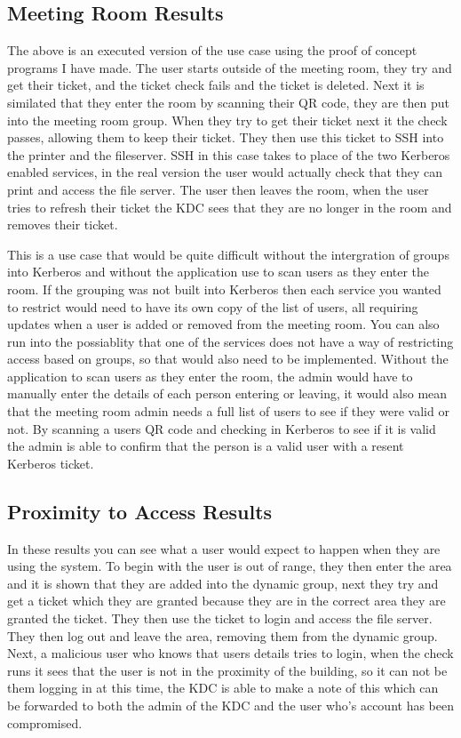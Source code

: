 \documentclass[]{report}   %
\begin{document}
\subsection{Meeting Room Results}
The above is an executed version of the use case using the proof of concept programs I have made. The user starts outside of the meeting room, they try and get their ticket, and the ticket check fails and the ticket is deleted. Next it is similated that they enter the room by scanning their QR code, they are then put into the meeting room group. When they try to get their ticket next it the check passes, allowing them to keep their ticket. They then use this ticket to SSH into the printer and the fileserver. SSH in this case takes to place of the two Kerberos enabled services, in the real version the user would actually check that they can print and access the file server. The user then leaves the room, when the user tries to refresh their ticket the KDC sees that they are no longer in the room and removes their ticket.

This is a use case that would be quite difficult without the intergration of groups into Kerberos and without the application use to scan users as they enter the room. If the grouping was not built into Kerberos then each service you wanted to restrict would need to have its own copy of the list of users, all requiring updates when a user is added or removed from the meeting room. You can also run into the possiablity that one of the services does not have a way of restricting access based on groups, so that would also need to be implemented. Without the application to scan users as they enter the room, the admin would have to manually enter the details of each person entering or leaving, it would also mean that the meeting room admin needs a full list of users to see if they were valid or not. By scanning a users QR code and checking in Kerberos to see if it is valid the admin is able to confirm that the person is a valid user with a resent Kerberos ticket.

\subsection{Proximity to Access Results}
In these results you can see what a user would expect to happen when they are using the system. To begin with the user is out of range, they then enter the area and it is shown that they are added into the dynamic group, next they try and get a ticket which they are granted because they are in the correct area they are granted the ticket. They then use the ticket to login and access the file server. They then log out and leave the area, removing them from the dynamic group. Next, a malicious user who knows that users details tries to login, when the check runs it sees that the user is not in the proximity of the building, so it can not be them logging in at this time, the KDC is able to make a note of this which can be forwarded to both the admin of the KDC and the user who's account has been compromised.
\end{document}

